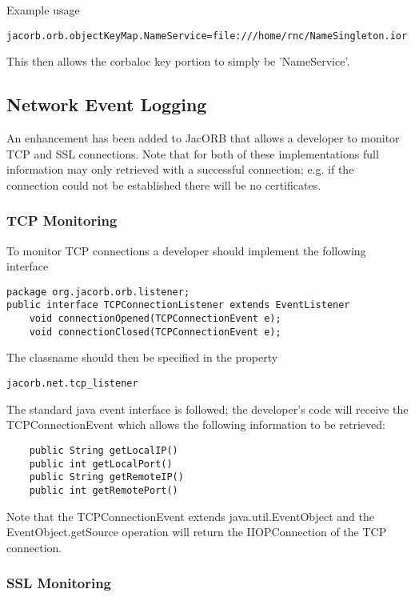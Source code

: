 Example usage

{\tt jacorb.orb.objectKeyMap.NameService=file:///home/rnc/NameSingleton.ior}

This then allows the corbaloc key portion to simply be 'NameService'.

\subsection{Network Event Logging}
\label{eventLogging}

An enhancement has been added to JacORB that allows a developer to monitor TCP and SSL connections.
Note that for both of these implementations full information may only retrieved with a successful connection;
e.g. if the connection could not be established there will be no certificates.

\subsubsection{TCP Monitoring}

To monitor TCP connections a developer should implement the following interface
\begin{small}
\begin{verbatim}
package org.jacorb.orb.listener;
public interface TCPConnectionListener extends EventListener
    void connectionOpened(TCPConnectionEvent e);
    void connectionClosed(TCPConnectionEvent e);
\end{verbatim}
\end{small}
The classname should then be specified in the property
\begin{verbatim}
jacorb.net.tcp_listener
\end{verbatim}

The standard java event interface is followed; the developer's code will receive the
TCPConnectionEvent which allows the following information to be retrieved:
\begin{small}
\begin{verbatim}
    public String getLocalIP()
    public int getLocalPort()
    public String getRemoteIP()
    public int getRemotePort()
\end{verbatim}
\end{small}
Note that the TCPConnectionEvent extends java.util.EventObject and the EventObject.getSource
operation will return the IIOPConnection of the TCP connection.

\subsubsection{SSL Monitoring}

